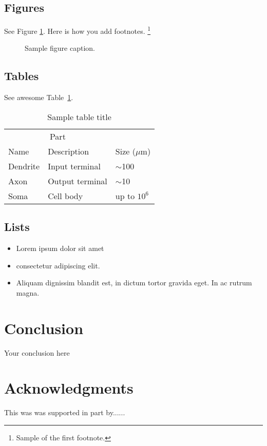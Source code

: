 \subsection{Figures}
\lipsum[10] 
See Figure \ref{fig:fig1}. Here is how you add footnotes. \footnote{Sample of the first footnote.}
\lipsum[11] 

\begin{figure}
  \centering
  \fbox{\rule[-.5cm]{4cm}{4cm} \rule[-.5cm]{4cm}{0cm}}
  \caption{Sample figure caption.}
  \label{fig:fig1}
\end{figure}

\subsection{Tables}
\lipsum[12]
See awesome Table~\ref{tab:table}.

\begin{table}
 \caption{Sample table title}
  \centering
  \begin{tabular}{lll}
    \toprule
    \multicolumn{2}{c}{Part}                   \\
    \cmidrule(r){1-2}
    Name     & Description     & Size ($\mu$m) \\
    \midrule
    Dendrite & Input terminal  & $\sim$100     \\
    Axon     & Output terminal & $\sim$10      \\
    Soma     & Cell body       & up to $10^6$  \\
    \bottomrule
  \end{tabular}
  \label{tab:table}
\end{table}

\subsection{Lists}
\begin{itemize}
\item Lorem ipsum dolor sit amet
\item consectetur adipiscing elit. 
\item Aliquam dignissim blandit est, in dictum tortor gravida eget. In ac rutrum magna.
\end{itemize}


\section{Conclusion}
Your conclusion here

\section*{Acknowledgments}
This was was supported in part by......

  
  



